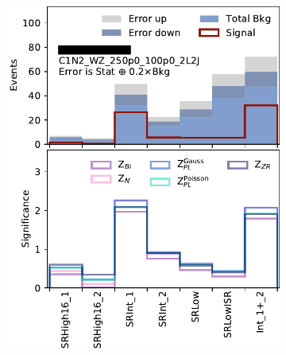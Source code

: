 \begin{figure}[tp]
\centering
\begin{subfigure}{0.48\textwidth}
\centering
\includegraphics[width=\textwidth]{figures/2ljets_disco_Int_C1N2_WZ_250p0_100p0_2L2J.png}
\caption{}
\end{subfigure}
\hfill
\begin{subfigure}{0.48\textwidth}
\centering

\end{subfigure}
\end{figure}
